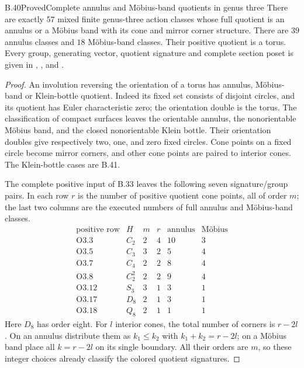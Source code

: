 \begin{claim}{B.40}{Proved}{Complete annulus and M\"obius-band quotients in genus three}
There are exactly $57$ mixed finite genus-three action classes whose
full quotient is an annulus or a M\"obius band with its cone and mirror
corner structure.  There are $39$ annulus classes and $18$ M\"obius-band
classes.  Their positive quotient is a torus.  Every group, generating
vector, quotient signature and complete section poset is given in
,
, and
.
\end{claim}
\begin{proof}
An involution reversing the orientation of a torus has annulus,
M\"obius-band or Klein-bottle quotient.  Indeed its fixed set consists
of disjoint circles, and its quotient has Euler characteristic zero;
the orientation double is the torus.  The classification of compact
surfaces leaves the orientable annulus, the nonorientable M\"obius
band, and the closed nonorientable Klein bottle.  Their orientation
doubles give respectively two, one, and zero fixed circles.  Cone
points on a fixed circle become mirror corners, and other cone points
are paired to interior cones.  The Klein-bottle cases are B.41.

The complete positive input of B.33 leaves the following seven
signature/group pairs.  In each row $r$ is the number of positive
quotient cone points, all of order $m$; the last two columns are the
executed numbers of full annulus and M\"obius-band classes.
\[
\begin{array}{c|c|r|r|r|r}
 \text{positive row}&H&m&r&\text{annulus}&\text{M\"obius}\\\hline
 \mathrm O3.3&C_2&2&4&10&3\\
 \mathrm O3.5&C_3&3&2&5&4\\
 \mathrm O3.7&C_4&2&2&8&4\\
 \mathrm O3.8&C_2^2&2&2&9&4\\
 \mathrm O3.12&S_3&3&1&3&1\\
 \mathrm O3.17&D_8&2&1&3&1\\
 \mathrm O3.18&Q_8&2&1&1&1
\end{array}                                             \tag{B.40.1}
\]
Here $D_8$ has order eight.  For $l$ interior cones, the total number
of corners is $r-2l$.  On an annulus distribute them as
$k_1\le k_2$ with $k_1+k_2=r-2l$; on a M\"obius band place all
$k=r-2l$ on its single boundary.  All their orders are $m$, so these
integer choices already classify the colored quotient signatures.


\end{proof}
